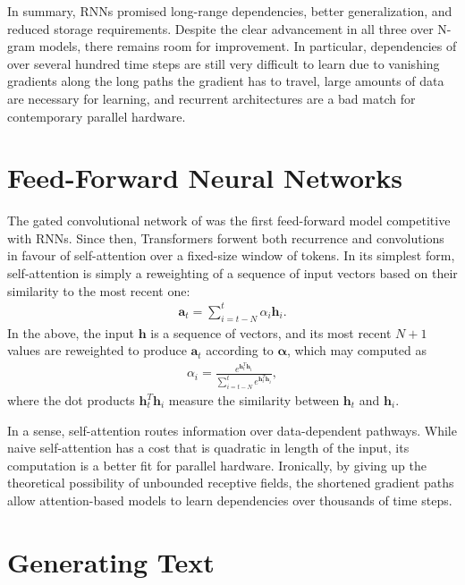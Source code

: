 \documentclass[12pt,a4paper,oneside]{book}
\newcommand{\vh}{\mathbf{h}}
\newcommand{\va}{\mathbf{a}}
\begin{document}
In summary, RNNs promised long-range dependencies, better generalization, and reduced storage requirements.
Despite the clear advancement in all three over N-gram models, there remains room for improvement.
In particular, dependencies of over several hundred time steps are still very difficult to learn due to vanishing gradients along the long paths the gradient has to travel, large amounts of data are necessary for learning, and recurrent architectures are a bad match for contemporary parallel hardware.

\section{Feed-Forward Neural Networks}

The gated convolutional network of \citet{dauphin2017language} was the first feed-forward model competitive with RNNs.
Since then, Transformers \citep{vaswani2017attention} forwent both recurrence and convolutions in favour of self-attention \citep{bahdanau2014neural} over a fixed-size window of tokens.
In its simplest form, self-attention is simply a reweighting of a sequence of input vectors based on their similarity to the most recent one:
\begin{align*}
\va_t = \sum^t_{i = t - N} \alpha_i \vh_i.
\end{align*}
In the above, the input $\vh$ is a sequence of vectors, and its most recent $N+1$ values are reweighted to produce $\va_t$ according to $\mathbf{\alpha}$, which may computed as
\begin{align*}
\alpha_i = \frac{e^{\vh_t^T \vh_i}}{\sum^t_{i=t-N}e^{\vh_t^T \vh_i}},
\end{align*}
where the dot products $\vh_t^T \vh_i$ measure the similarity between $\vh_t$ and $\vh_i$.

In a sense, self-attention routes information over data-dependent pathways.
While naive self-attention has a cost that is quadratic in length of the input, its computation is a better fit for parallel hardware.
Ironically, by giving up the theoretical possibility of unbounded receptive fields, the shortened gradient paths allow attention-based models to learn dependencies over thousands of time steps.


\section{Generating Text}
\end{document}
